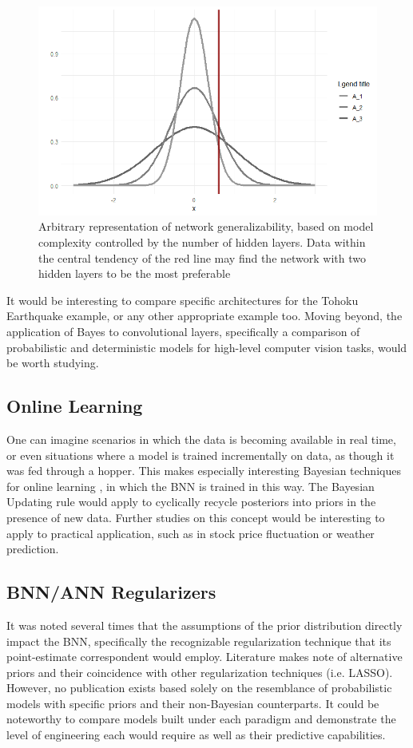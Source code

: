 \begin{figure}[H]
    \centering
    \includegraphics[width = .6\textwidth]{Figures/BNN_modelcheck.png}
    \caption{\footnotesize{Arbitrary representation of network generalizability, based on model complexity controlled by the number of hidden layers. Data within the central tendency of the red line may find the network with two hidden layers to be the most preferable}}
    \label{BNNmodelcheck}
\end{figure}

It would be interesting to compare specific architectures for the Tohoku Earthquake example, or any other appropriate example too.  Moving beyond, the application of Bayes to convolutional layers, specifically a comparison of probabilistic and deterministic models for high-level computer vision tasks, would be worth studying.


\subsection{Online Learning}
One can imagine scenarios in which the data is becoming available in real time, or even situations where a model is trained incrementally on data, as though it was fed through a hopper.  This makes especially interesting Bayesian techniques for online learning \cite{opper1999bayesian}, in which the BNN is trained in this way.  The Bayesian Updating rule would apply to cyclically recycle posteriors into priors in the presence of new data.  Further studies on this concept would be interesting to apply to practical application, such as in stock price fluctuation or weather prediction.

\subsection{BNN/ANN Regularizers}
It was noted several times that the assumptions of the prior distribution directly impact the BNN, specifically the recognizable regularization technique that its point-estimate correspondent would employ.  Literature \cite{vladimirova2019understanding} \cite{chiuso2016regularization} makes note of alternative priors and their coincidence with other regularization techniques (i.e. LASSO).  However, no publication exists based solely on the resemblance of probabilistic models with specific priors and their non-Bayesian counterparts.  It could be noteworthy to compare models built under each paradigm and demonstrate the level of engineering each would require as well as their predictive capabilities.